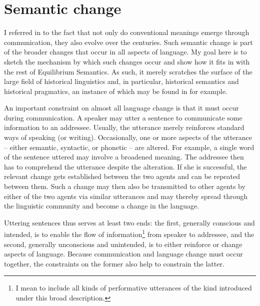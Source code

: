 \chapter{Semantic change} \label{ch:semantic change}

I referred in  to the fact that not only do conventional meanings emerge through communication, they also evolve over the centuries. Such semantic change is part of the broader changes that occur in all aspects of language. My goal here is to sketch the mechanism by which such changes occur and show how it fits in with the rest of Equilibrium Semantics. As such, it merely scratches the surface of the large field of historical linguistics and, in particular, historical semantics and historical pragmatics, an instance of which may be found in \citet{td:rsm} for example.

An important constraint on almost all language change is that it must occur during communication. A speaker may utter a sentence to communicate some information to an addressee. Usually, the utterance merely reinforces standard ways of speaking (or writing). Occasionally, one or more aspects of the utterance -- either semantic, syntactic, or phonetic -- are altered. For example, a single word of the sentence uttered may involve a broadened meaning. The addressee then has to comprehend the utterance despite the alteration. If she is successful, the relevant change gets established between the two agents and can be repeated between them. Such a change may then also be transmitted to other agents by either of the two agents via similar utterances and may thereby spread through the linguistic community and become a change in the language.

Uttering sentences thus serves at least two ends: the first, generally conscious and intended, is to enable the flow of information\footnote{I mean to include all kinds of performative utterances of the kind \citet{austin:htdtww} introduced under this broad description.} from speaker to addressee, and the second, generally unconscious and unintended, is to either reinforce or change aspects of language. Because communication and language change must occur together, the constraints on the former also help to constrain the latter.


